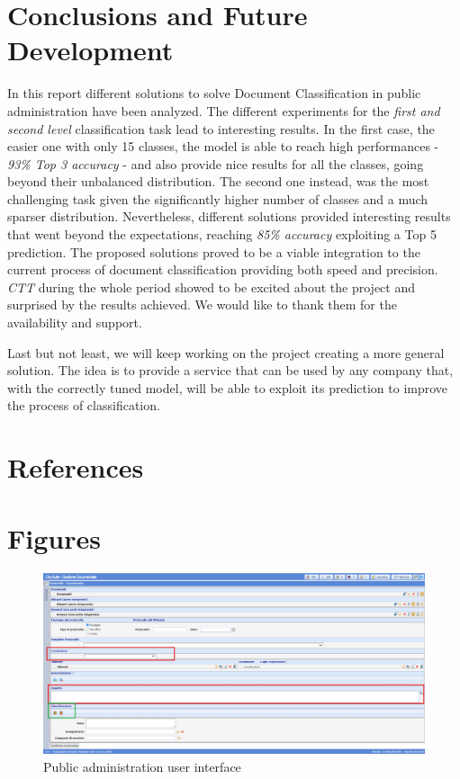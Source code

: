 \documentclass[12pt]{article}
\begin{document}
\section{Conclusions and Future Development}
In this report different solutions to solve Document Classification in public administration have been analyzed. The different experiments for the \textit{first and second level} classification task lead to interesting results. In the first case, the easier one with only 15 classes, the model is able to reach high performances - \textit{93\% Top 3 accuracy} - and also provide nice results for all the classes, going beyond their unbalanced distribution. The second one instead, was the most challenging task given the significantly higher number of classes and a much sparser distribution. Nevertheless, different solutions provided interesting results that went beyond the expectations, reaching \textit{85\% accuracy} exploiting a Top 5 prediction. The proposed solutions proved to be a viable integration to the current process of document classification providing both speed and precision. \textit{CTT} during the whole period showed to be excited about the project and surprised by the results achieved. We would like to thank them for the availability and support.

Last but not least, we will keep working on the project creating a more general solution. The idea is to provide a service that can be used by any company that, with the correctly tuned model, will be able to exploit its prediction to improve the process of classification.

\newpage
\section{References}
\printbibliography[heading=none]

\newpage
\section{Figures}
\begin{figure}[ht!]
    \begin{adjustwidth}{-3.5cm}{}
    	    \begin{center}
        \includegraphics[width=1.5\textwidth]{interface.png}
            \end{center}
    \end{adjustwidth}
    \captionsetup{justification = centering}
    \caption{Public administration user interface}
    \label{fig:interface}
\end{figure}
\end{document}
